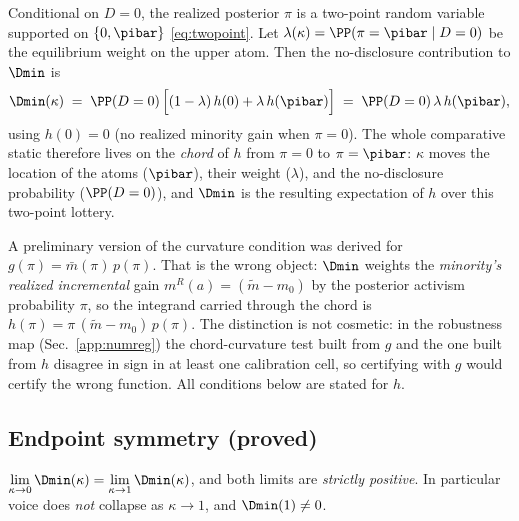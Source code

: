Conditional on $D=0$, the realized posterior $\pi$ is a two-point random
variable supported on $\{0,\pibar\}$ \eqref{eq:twopoint}. Let
$\lambda(\kappa)=\PP(\pi=\pibar\mid D=0)$ be the equilibrium weight on the
upper atom. Then the no-disclosure contribution to $\Dmin$ is
\begin{equation}
  \label{eq:lottery}
  \Dmin(\kappa)
  \;=\;
  \PP(D=0)\,\Bigl[(1-\lambda)\,h(0) + \lambda\,h(\pibar)\Bigr]
  \;=\;
  \PP(D=0)\,\lambda\,h(\pibar),
\end{equation}
using $h(0)=0$ (no realized minority gain when $\pi=0$). The whole
comparative static therefore lives on the \emph{chord} of $h$ from
$\pi=0$ to $\pi=\pibar$: $\kappa$ moves the location of the atoms
($\pibar$), their weight ($\lambda$), and the no-disclosure probability
($\PP(D=0)$), and $\Dmin$ is the resulting expectation of $h$ over this
two-point lottery.

\begin{remark}[Why the integrand is $h=\pi\,p$ and not $g=\bar m\,p$]
\label{rem:hnotg}
A preliminary version of the curvature condition was derived for
$g(\pi)=\bar m(\pi)\,p(\pi)$. That is the wrong object: $\Dmin$ weights the
\emph{minority's realized incremental} gain $m^{R}(a)=(\widetilde m-m_0)$ by
the posterior activism probability $\pi$, so the integrand carried through
the chord is $h(\pi)=\pi\,(\widetilde m-m_0)\,p(\pi)$. The distinction is not
cosmetic: in the robustness map (Sec.~\ref{app:numreg}) the chord-curvature
test built from $g$ and the one built from $h$ disagree in sign in at least
one calibration cell, so certifying with $g$ would certify the wrong
function. All conditions below are stated for $h$.
\end{remark}

\subsection{Endpoint symmetry (proved)}
\label{app:symmetry}

\begin{lemma}
\label{lem:symmetry}
$\displaystyle \lim_{\kappa\to 0}\Dmin(\kappa)
              =\lim_{\kappa\to 1}\Dmin(\kappa)$,
and both limits are \emph{strictly positive}. In particular voice does
\emph{not} collapse as $\kappa\to1$, and $\Dmin(1)\neq 0$.
\end{lemma}

